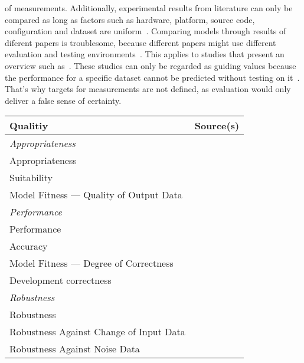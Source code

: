 of measurements.
Additionally, experimental results from literature can only be compared as long as factors such as
hardware, platform, source code, configuration and dataset are uniform~\citep{arpteg_software_2018}.
Comparing models through results of diferent papers is troublesome, because different papers
might use different evaluation and testing environments~\citep{baek_what_2019}.
This applies to studies that present an overview such as~\cite{chen_text_2021,long_scene_2021}.
These studies can only be regarded as guiding values because the performance for a specific dataset
cannot be predicted without testing on it~\cite{arpteg_software_2018}.
That's why targets for measurements are not defined, as evaluation would only deliver a false
sense of certainty.

\begin{table}[h]
    \centering\scriptsize
    \begin{tabular}{p{} p{}}
        \textbf{Qualitiy} & \textbf{Source(s)} \\
        \toprule
        \textit{Appropriateness} \\
        Appropriateness &~\cite{siebert_construction_2021} \\
        Suitability &~\cite{siebert_construction_2021} \\
        Model Fitness --- Quality of Output Data &~\cite{nakamichi_requirements-driven_2020} \\
        \midrule
        \textit{Performance} \\
        Performance &~\cite{ashmore_assuring_2021,vogelsang_requirements_2019} \\
        Accuracy &~\cite{nakamichi_requirements-driven_2020} \\
        Model Fitness --- Degree of Correctness &~\cite{nakamichi_requirements-driven_2020,
                                                    zhang_machine_2020} \\
        Development correctness &~\cite{siebert_construction_2021} \\
        \midrule
        \textit{Robustness} \\
        Robustness &~\cite{ashmore_assuring_2021, hu_towards_2020, siebert_construction_2021} \\
        Robustness Against Change of Input Data &~\cite{nakamichi_requirements-driven_2020} \\
        Robustness Against Noise Data &~\cite{nakamichi_requirements-driven_2020} \\

\end{tabular}
\end{table}
